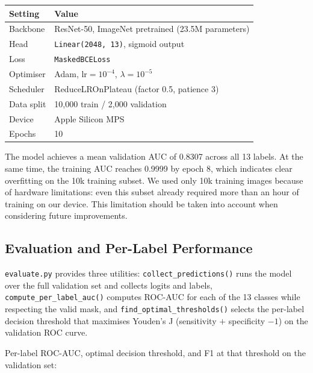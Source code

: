\documentclass[12pt]{article}
\begin{document}
\begin{center}
\begin{tabular}{ll}
\toprule
\textbf{Setting} & \textbf{Value} \\
\midrule
Backbone          & ResNet-50, ImageNet pretrained (23.5M parameters) \\
Head              & \texttt{Linear(2048, 13)}, sigmoid output \\
Loss              & \texttt{MaskedBCELoss} \\
Optimiser         & Adam, $\text{lr}=10^{-4}$, $\lambda=10^{-5}$ \\
Scheduler         & ReduceLROnPlateau (factor 0.5, patience 3) \\
Data split        & 10{,}000 train / 2{,}000 validation \\
Device            & Apple Silicon MPS \\
Epochs            & 10 \\
\bottomrule
\end{tabular}
\end{center}

The model achieves a mean validation AUC of 0.8307 across all 13 labels. At the same time, the training AUC reaches 0.9999 by epoch 8, which indicates clear overfitting on the 10k training subset. We used only 10k training images because of hardware limitations: even this subset already required more than an hour of training on our device. This limitation should be taken into account when considering future improvements.

\subsection{Evaluation and Per-Label Performance}

\texttt{evaluate.py} provides three utilities: \texttt{collect\_predictions()} runs the model over the full validation set and collects logits and labels, \texttt{compute\_per\_label\_auc()} computes ROC-AUC for each of the 13 classes while respecting the valid mask, and \texttt{find\_optimal\_thresholds()} selects the per-label decision threshold that maximises Youden's J (sensitivity $+$ specificity $-1$) on the validation ROC curve.

Per-label ROC-AUC, optimal decision threshold, and F1 at that threshold on the validation set:
\end{document}
